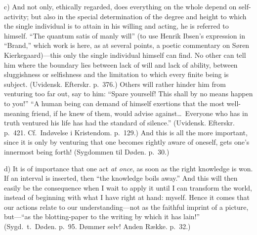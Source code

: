 \documentclass[12pt,a4paper]{book}
\newcommand{\opage}[1]{\marginnote{\footnotesize\textit{[#1]}}}
\begin{document}
c) And not only, ethically regarded, does everything on the whole depend
on self-activity; but also in the special determination of the degree and
height to which the single individual is to attain in his willing and
acting, he is referred to himself. ``The quantum satis of manly will'' (to
use Henrik Ibsen's expression in ``Brand,'' which work is here, as at
several points, a poetic commentary on Søren Kierkegaard)---this only the
single individual himself can find. No other can tell him where the
boundary lies between lack of will and lack of ability, between
sluggishness or selfishness and the limitation to which every finite being
is subject. (Uvidensk. Efterskr. p.~376.) Others will rather hinder him
from venturing too far out, say to him: ``Spare yourself! This shall by no
means happen to you!'' ``A human being can demand of himself exertions
that the most well-meaning friend, if he knew of them, would advise
against\dots\ Everyone
\opage{101}who has in truth ventured his life has had the standard of
silence.'' (Uvidensk. Efterskr. p.~421. Cf.\ Indøvelse i Kristendom.
p.~129.) And this is all the more important, since it is only by venturing
that one becomes rightly aware of oneself, gets one's innermost being
forth! (Sygdommen til Døden. p.~30.)

d) It is of importance that one act \textit{at once}, as soon as the right
knowledge is won. If an interval is inserted, then ``the knowledge boils
away.'' And this will then easily be the consequence when I wait to apply
it until I can transform the world, instead of beginning with what I have
right at hand: myself. Hence it comes that our actions relate to our
understanding---not as the faithful imprint of a picture, but---``as the
blotting-paper to the writing by which it has lain!'' (Sygd.\ t.\ Døden.
p.~95. Dømmer selv! Anden Række. p.~32.)
\end{document}
